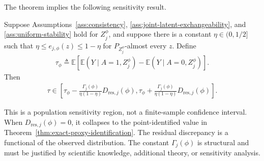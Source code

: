 The theorem implies the following sensitivity result.
\begin{proposition}
\label{prop:population-sensitivity-region}
\normalfont
Suppose Assumptions~\ref{ass:consistency}, \ref{ass:joint-latent-exchangeability}, and \ref{ass:uniform-stability} hold for $Z_j^\phi$, and suppose there is a constant $\eta\in(0,1/2]$ such that $\eta\le e_{j,\phi}(z)\le1-\eta$ for $P_{Z_j^\phi}$-almost every $z$. Define
\begin{align}
	\tau_\phi
	\triangleq
	\mathbb E\!\left[
	\mathbb E(Y\mid A=1,Z_j^\phi)
	-
	\mathbb E(Y\mid A=0,Z_j^\phi)
	\right].
\end{align}
Then
\begin{align}
	\tau\in
	\left[
	\tau_\phi-
	\frac{\Gamma_j(\phi)}{\eta(1-\eta)}D_{\mathrm{res},j}(\phi),
	\tau_\phi+
		\frac{\Gamma_j(\phi)}{\eta(1-\eta)}D_{\mathrm{res},j}(\phi)
	\right].
\end{align}
\end{proposition}

This is a population sensitivity region, not a finite-sample confidence interval. When $D_{\mathrm{res},j}(\phi)=0$, it collapses to the point-identified value in Theorem~\ref{thm:exact-proxy-identification}. The residual discrepancy is a functional of the observed distribution.
The constant $\Gamma_j(\phi)$ is structural and must be justified by scientific knowledge, additional theory, or sensitivity analysis.
